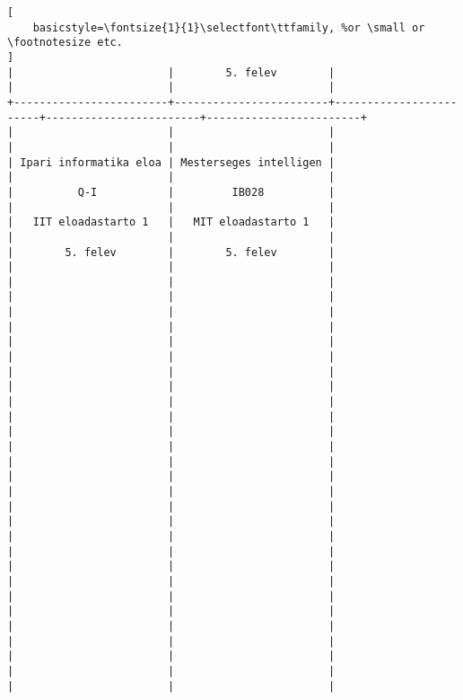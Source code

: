 \begin{lstlisting}[
    basicstyle=\fontsize{1}{1}\selectfont\ttfamily, %or \small or \footnotesize etc.
]
|                        |        5. felev        |                        |                        |                        | 
+------------------------+------------------------+------------------------+------------------------+------------------------+
|                        |                        |                        |                        |                        | 
| Ipari informatika eloa | Mesterseges intelligen |                        |                        |                        | 
|          Q-I           |         IB028          |                        |                        |                        | 
|   IIT eloadastarto 1   |   MIT eloadastarto 1   |                        |                        |                        | 
|        5. felev        |        5. felev        |                        |                        |                        | 
|                        |                        |                        |                        |                        | 
|                        |                        |                        |                        |                        | 
|                        |                        |                        |                        |                        | 
|                        |                        |                        |                        |                        | 
|                        |                        |                        |                        |                        | 
|                        |                        |                        |                        |                        | 
|                        |                        |                        |                        |                        | 
|                        |                        |                        |                        |                        | 
|                        |                        |                        |                        |                        | 
|                        |                        |                        |                        |                        | 
|                        |                        |                        |                        |                        | 
|                        |                        |                        |                        |                        | 
|                        |                        |                        |                        |                        | 
|                        |                        |                        |                        |                        | 

\end{lstlisting}
